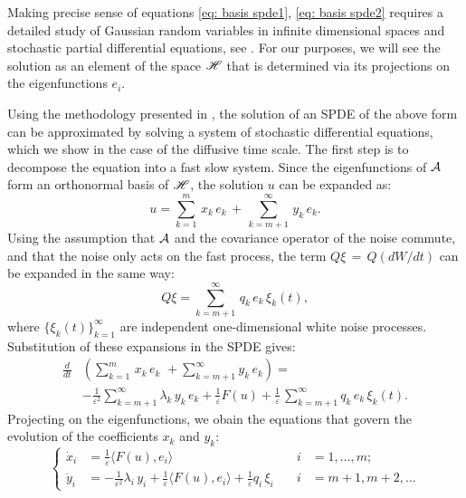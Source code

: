 Making precise sense of equations \eqref{eq: basis spde1}, \eqref{eq: basis spde2} requires a detailed study of Gaussian random variables in infinite dimensional spaces and stochastic partial differential equations, see \citep{da2008stochastic,hairer2009introduction}.
For our purposes, we will see the solution as an element of the space $\mathscr H$ that is determined via its projections on the eigenfunctions $e_i$.

Using the methodology presented in \cite{abdulle2012numerical}, the solution of an SPDE of the above form can be approximated by solving a system of stochastic differential equations, which we show in the case of the diffusive time scale.
The first step is to decompose the equation into a fast slow system.
Since the eigenfunctions of $\mathcal A$ form an orthonormal basis of $\mathscr H$, the solution $u$ can be expanded as:
\begin{equation*}
    u = \sum_{k=1}^{m} \,x_{k}\,e_{k} \,+\,\sum_{k=m+1}^{\infty} \,y_{k}\,e_{k}.
\end{equation*}
Using the assumption that $\mathcal A$ and the covariance operator of the noise commute, and that the noise only acts on the fast process, the term $Q{\xi}\,=\,Q (dW/dt)$ can be expanded in the same way:
\begin{equation*}
    Q{\xi}= \sum_{k=m+1}^{\infty}\,q_{k}\,e_{k}\,{\xi}_{k}(t),
\end{equation*}
where $\{\xi_{k}(t) \}_{k=1}^{\infty}$ are independent one-dimensional white noise processes.
Substitution of these expansions in the SPDE gives:
\begin{equation*}
    \begin{aligned}
        \frac d{dt} & \left(\sum_{k=1}^{m}\,x_{k}\,e_{k}\,\,+\sum_{k=m+1}^{\infty}
            y_{k}\,e_{k} \right) = \\ & -\frac 1{\varepsilon^{2}}\sum_{k=m+1}^{\infty}
        \lambda_{k}\,y_{k}\,e_{k} + \frac 1 \varepsilon F(u) + \frac 1 \varepsilon\,
        \sum_{k=m+1}^{\infty}q_{k}\,e_{k}\,\xi_{k}(t).
    \end{aligned}
\end{equation*}
Projecting on the eigenfunctions, we obain the equations that govern the evolution of the coefficients $x_k$ and $y_k$:
\begin{equation*}
    \left\{\begin{aligned}
            \dot x_{i} &= \frac 1 \varepsilon\langle F(u), e_{i}\rangle & \quad i & = 1,\dots,
            m;\\ \dot y_{i} &= -\frac 1 {\varepsilon^{2}} {\lambda}_{i}\,y_{i} + \frac 1\varepsilon\langle
            F(u), e_{i}\rangle +\frac 1\varepsilon q_{i}\,\xi_{i} & \quad i &= m+1,m+2, \dots
        \end{aligned} \right.
\end{equation*}

